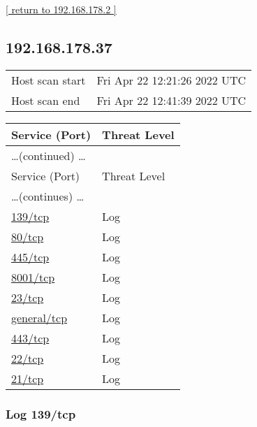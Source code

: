 \documentclass{article}
\begin{document}
\begin{footnotesize}\hyperref[host:192.168.178.2]{[ return to 192.168.178.2 ]}\end{footnotesize}
\subsection{192.168.178.37}
\label{host:192.168.178.37}

\begin{tabular}{ll}
Host scan start&Fri Apr 22 12:21:26 2022 UTC\\
Host scan end&Fri Apr 22 12:41:39 2022 UTC\\
\end{tabular}

\begin{longtable}{|l|l|}
\hline
\rowcolor{gvm_report}Service (Port)&Threat Level\\
\hline
\endfirsthead
\multicolumn{2}{l}{\hfill\ldots (continued) \ldots}\\
\hline
\rowcolor{gvm_report}Service (Port)&Threat Level\\
\hline
\endhead
\hline
\multicolumn{2}{l}{\ldots (continues) \ldots}\\
\endfoot
\hline
\endlastfoot
\hline
\hyperref[port:192.168.178.37 139/tcp Log]{139/tcp}&Log\\
\hline
\hyperref[port:192.168.178.37 80/tcp Log]{80/tcp}&Log\\
\hline
\hyperref[port:192.168.178.37 445/tcp Log]{445/tcp}&Log\\
\hline
\hyperref[port:192.168.178.37 8001/tcp Log]{8001/tcp}&Log\\
\hline
\hyperref[port:192.168.178.37 23/tcp Log]{23/tcp}&Log\\
\hline
\hyperref[port:192.168.178.37 general/tcp Log]{general/tcp}&Log\\
\hline
\hyperref[port:192.168.178.37 443/tcp Log]{443/tcp}&Log\\
\hline
\hyperref[port:192.168.178.37 22/tcp Log]{22/tcp}&Log\\
\hline
\hyperref[port:192.168.178.37 21/tcp Log]{21/tcp}&Log\\
\hline
\end{longtable}



\subsubsection{Log 139/tcp}
\label{port:192.168.178.37 139/tcp Log}
\end{document}
